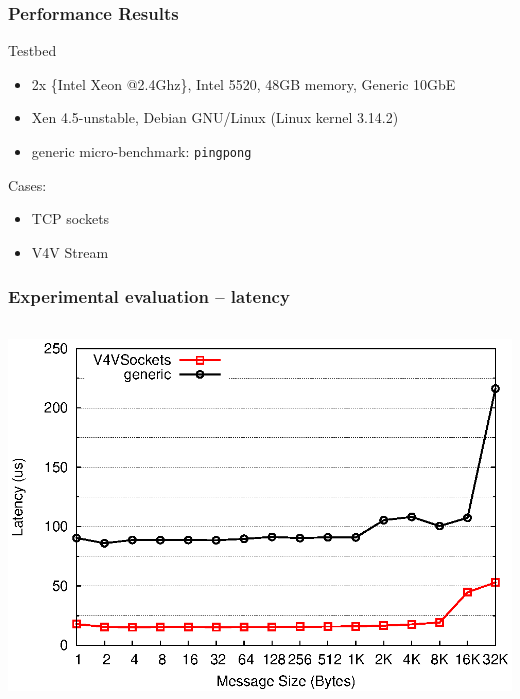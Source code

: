 \documentclass[red,slidestop,notes,compress,mathserif]{beamer}
\begin{document}
\begin{frame}
\frametitle{Performance Results}
\begin{block}{Testbed}
\begin{itemize}
\item 2x \{Intel Xeon @2.4Ghz\}, Intel 5520, 48GB memory, Generic 10GbE
\item Xen 4.5-unstable, Debian GNU/Linux (Linux kernel 3.14.2)
\item generic micro-benchmark: \texttt{pingpong}
\end{itemize}
\end{block}
{Cases:}
\begin{itemize}
\item TCP sockets
\item V4V Stream
\end{itemize}
\end{frame}


\begin{frame}
\frametitle{Experimental evaluation -- latency}
\begin{columns}
\includegraphics[width=\textwidth]{figures/v4v_lat.eps}
\end{columns}
\end{frame}
\end{document}
